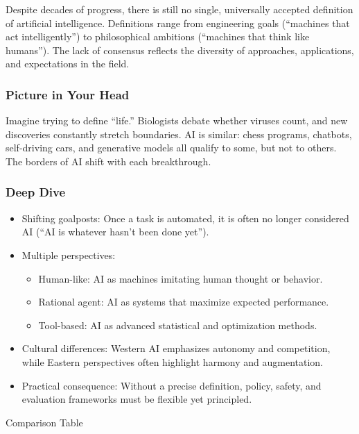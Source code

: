 \documentclass[
  letterpaper,
  DIV=11,
  numbers=noendperiod]{scrreprt}
\providecommand{\tightlist}{%
  \setlength{\itemsep}{0pt}\setlength{\parskip}{0pt}}
\begin{document}
Despite decades of progress, there is still no single, universally
accepted definition of artificial intelligence. Definitions range from
engineering goals (``machines that act intelligently'') to philosophical
ambitions (``machines that think like humans''). The lack of consensus
reflects the diversity of approaches, applications, and expectations in
the field.

\subsubsection{Picture in Your Head}\label{picture-in-your-head-9}

Imagine trying to define ``life.'' Biologists debate whether viruses
count, and new discoveries constantly stretch boundaries. AI is similar:
chess programs, chatbots, self-driving cars, and generative models all
qualify to some, but not to others. The borders of AI shift with each
breakthrough.

\subsubsection{Deep Dive}\label{deep-dive-9}

\begin{itemize}
\item
  Shifting goalposts: Once a task is automated, it is often no longer
  considered AI (``AI is whatever hasn't been done yet'').
\item
  Multiple perspectives:

  \begin{itemize}
  \tightlist
  \item
    Human-like: AI as machines imitating human thought or behavior.
  \item
    Rational agent: AI as systems that maximize expected performance.
  \item
    Tool-based: AI as advanced statistical and optimization methods.
  \end{itemize}
\item
  Cultural differences: Western AI emphasizes autonomy and competition,
  while Eastern perspectives often highlight harmony and augmentation.
\item
  Practical consequence: Without a precise definition, policy, safety,
  and evaluation frameworks must be flexible yet principled.
\end{itemize}

Comparison Table
\end{document}
